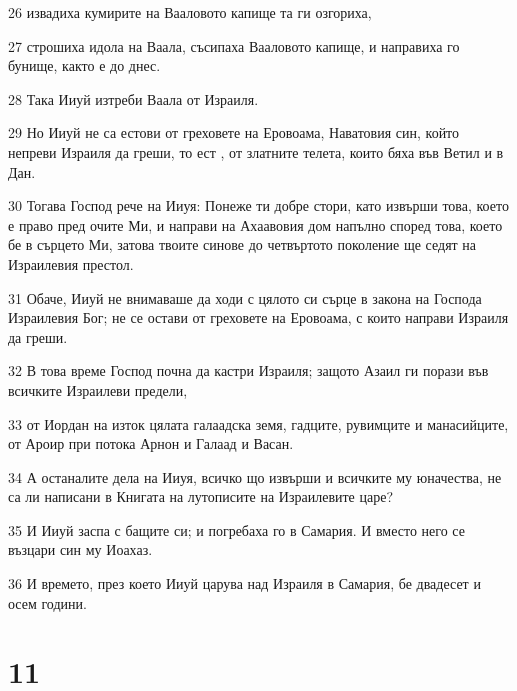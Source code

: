 \par 26 извадиха кумирите на Вааловото капище та ги озгориха,
\par 27 строшиха идола на Ваала, съсипаха Вааловото капище, и направиха го бунище, както е до днес.
\par 28 Така Ииуй изтреби Ваала от Израиля.
\par 29 Но Ииуй не са естови от греховете на Еровоама, Наватовия син, който непреви Израиля да греши, то ест , от златните телета, които бяха във Ветил и в Дан.
\par 30 Тогава Господ рече на Ииуя: Понеже ти добре стори, като извърши това, което е право пред очите Ми, и направи на Ахаавовия дом напълно според това, което бе в сърцето Ми, затова твоите синове до четвъртото поколение ще седят на Израилевия престол.
\par 31 Обаче, Ииуй не внимаваше да ходи с цялото си сърце в закона на Господа Израилевия Бог; не се остави от греховете на Еровоама, с които направи Израиля да греши.
\par 32 В това време Господ почна да кастри Израиля; защото Азаил ги порази във всичките Израилеви предели,
\par 33 от Иордан на изток цялата галаадска земя, гадците, рувимците и манасийците, от Ароир при потока Арнон и Галаад и Васан.
\par 34 А останалите дела на Ииуя, всичко що извърши и всичките му юначества, не са ли написани в Книгата на лутописите на Израилевите царе?
\par 35 И Ииуй заспа с бащите си; и погребаха го в Самария. И вместо него се възцари син му Иоахаз.
\par 36 И времето, през което Ииуй царува над Израиля в Самария, бе двадесет и осем години.

\chapter{11}

